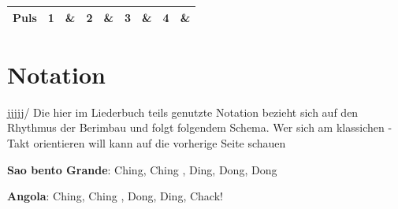 \documentclass[fontsize=14pt, paper=a4, twoside, DIV=20]{scrreprt} %
\begin{document}
{\begin{center}
\begin{tabularx}{\textwidth}{|c|c|X|X|X|X|X|X|X|X|}
        \multicolumn{2}{|c|}{Puls}        & \textbf{ 1} & \textbf{\&}           & \textbf{2} & \textbf{\&}          & \textbf{3}          & \textbf{\&}           & \textbf{4} & \textbf{\&}            \\ \hline
\end{tabularx}
\end{center}


}





\chapter*{Notation}
jjjjj/
Die hier im Liederbuch teils genutzte Notation bezieht sich auf den Rhythmus der Berimbau und folgt folgendem Schema. Wer sich am klassichen -Takt orientieren will kann auf die vorherige Seite schauen

\textbf{Sao bento Grande}: Ching,  Ching , Ding, Dong, Dong

\textbf{Angola}: Ching,  Ching , Dong, Ding, Chack!
\end{document}
